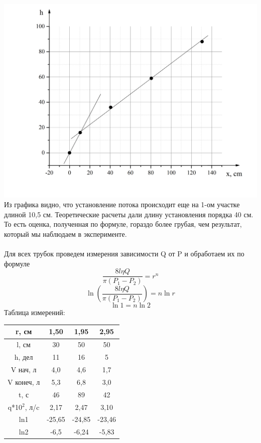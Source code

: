 \documentclass[11pt]{article}
\begin{document}
\ \\
\ \\
\includegraphics[scale=0.53]{Graph4.jpg}
\newpage
Из графика видно, что установление потока происходит еще на 1-ом участке длиной 10,5 см. Теоретические расчеты дали длину установления порядка 40 см. То есть оценка, полученная по формуле, гораздо более грубая, чем результат, который мы наблюдаем в эксперименте.
\ \\
\ \\
\indent Для всех трубок проведем измерения зависимости Q от P и обработаем их по формуле 
$$\frac{8l\eta Q}{\pi(P_1-P_2)}=r^n$$
$$\ln(\frac{8l\eta Q}{\pi(P_1-P_2)})=n\ln r$$
$$\ln1=n\ln2$$
\indent Таблица измерений: \\
\begin{tabular}{|c|c|c|c|}
\hline 
r, см & 1,50 & 1,95 & 2,95 \\ 
\hline 
l, см & 30 & 50 & 50 \\ 
\hline 
h, дел & 11 & 16 & 5 \\ 
\hline 
V нач, л & 4,0 & 4,6 & 1,7 \\ 
\hline 
V конеч, л & 5,3 & 6,8 & 3,0 \\ 
\hline 
t, с & 46 & 89 & 42 \\ 
\hline 
q*10$^2$, л/c & 2,17 & 2,47 & 3,10 \\ 
\hline 
ln1 & -25,65 & -24,85 & -23,46 \\ 
\hline 
ln2 & -6,5 & -6,24 & -5,83 \\ 
\hline 
\end{tabular}
\ \\
\ \\
\end{document}
